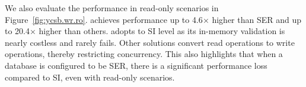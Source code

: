We also evaluate the performance in read-only scenarios in Figure~\ref{fig:ycsb.wr.ro}. \sysname achieves performance up to 4.6$\times$ higher than SER and up to 20.4$\times$ higher than others. \sysname adopts to SI level as its in-memory validation is nearly costless and rarely fails. Other solutions convert read operations to write operations, thereby restricting concurrency. 
This also highlights that when a database is configured to be SER, there is a significant performance loss compared to SI, even with read-only scenarios. %





